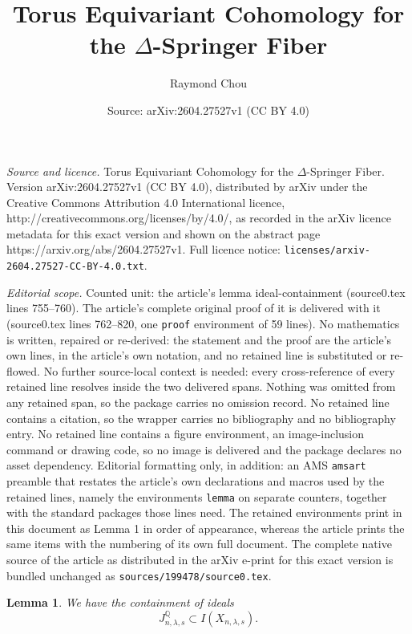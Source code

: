 \documentclass[10pt,a4paper]{amsart}
\title{Torus Equivariant Cohomology for the $\Delta$-Springer Fiber}
\author{Raymond Chou}
\date{Source: arXiv:2604.27527v1 (CC BY 4.0)}
\newtheorem{lemma}{Lemma}
\newcommand{\QQ}{{\mathbb{Q}}}
\begin{document}
\maketitle

\noindent\emph{Source and licence.} Torus Equivariant Cohomology for the $\Delta$-Springer Fiber. Version arXiv:2604.27527v1 (CC BY 4.0), distributed by arXiv under the Creative Commons Attribution 4.0 International licence, http://creativecommons.org/licenses/by/4.0/, as recorded in the arXiv licence metadata for this exact version and shown on the abstract page https://arxiv.org/abs/2604.27527v1. Full licence notice: \texttt{licenses/arxiv-2604.27527-CC-BY-4.0.txt}.\par\smallskip

\noindent\textit{Editorial scope.} Counted unit: the article's lemma ideal-containment (source0.tex lines 755--760). The article's complete original proof of it is delivered with it (source0.tex lines 762--820, one \texttt{proof} environment of 59 lines). No mathematics is written, repaired or re-derived: the statement and the proof are the article's own lines, in the article's own notation, and no retained line is substituted or re-flowed.  No further source-local context is needed: every cross-reference of every retained line resolves inside the two delivered spans.  Nothing was omitted from any retained span, so the package carries no omission record.  No retained line contains a citation, so the wrapper carries no bibliography and no bibliography entry.  No retained line contains a figure environment, an image-inclusion command or drawing code, so no image is delivered and the package declares no asset dependency.  Editorial formatting only, in addition: an AMS \texttt{amsart} preamble that restates the article's own declarations and macros used by the retained lines, namely the environments \texttt{lemma} on separate counters, together with the standard packages those lines need.  The retained environments print in this document as Lemma 1 in order of appearance, whereas the article prints the same items with the numbering of its own full document.  The complete native source of the article as distributed in the arXiv e-print for this exact version is bundled unchanged as \texttt{sources/199478/source0.tex}.
\begin{lemma}\label{lem: ideal-containment}
    We have the containment of ideals
    \[
    J^\QQ_{n,\lambda,s}\subset I(X_{n,\lambda,s}).
    \]
\end{lemma}
\end{document}

